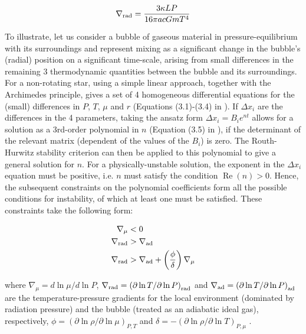 \documentclass[12pt, a4paper]{report}
\begin{document}
\begin{equation}
\nabla_{\textnormal{rad}} = \frac{3\kappa LP}{16\pi acGmT^{4}}
\end{equation}

To illustrate, let us consider a bubble of gaseous material in pressure-equilibrium with its surroundings and represent mixing as a significant change in the bubble's (radial) position on a significant time-scale, arising from small differences in the remaining 3 thermodynamic quantities between the bubble and its surroundings. For a non-rotating star, using a simple linear approach, together with the Archimedes principle, gives a set of 4 homogeneous differential equations for the (small) differences in $P$, $T$, $\mu$ and $r$ (Equations (3.1)-(3.4) in \cite{2017RSOS....470192S}). If $\Delta x_{i}$ are the differences in the 4 parameters, taking the ansatz form $\Delta x_{i} = B_{i} e^{nt}$ allows for a solution as a 3rd-order polynomial in $n$ (Equation (3.5) in \cite{2017RSOS....470192S}), if the determinant of the relevant matrix (dependent of the values of the $B_{i}$) is zero. The Routh-Hurwitz stability criterion can then be applied to this polynomial to give a general solution for $n$. For a physically-unstable solution, the exponent in the $\Delta x_{i}$ equation must be positive, i.e. $n$ must satisfy the condition $\operatorname{Re}(n) > 0$. Hence, the subsequent constraints on the polynomial coefficients form all the possible conditions for instability,  of which at least one must be satisfied. These constraints take the following form:

\begin{align}
\nabla _{\mu} &< 0 \label{mu_inv_ineq} \\
\nabla _{\textnormal{rad}} &> \nabla _{\textnormal{ad}} \label{schwarz_ineq} \\
\nabla _{\textnormal{rad}} &> \nabla _{\textnormal{ad}} + \left( \frac{\phi}{\delta} \right) \nabla _{\mu} \label{ledoux_ineq}
\end{align}

where $\nabla _{\mu} = d\ln\mu / d\ln P$, $\nabla _{\textnormal{rad}} = \left(\partial\ln T / \partial\ln P \right)_{\textnormal{rad}}$ and $\nabla _{\textnormal{ad}} = \left(\partial\ln T / \partial\ln P \right)_{\textnormal{ad}}$ are the temperature-pressure gradients for the local environment (dominated by radiation pressure) and the bubble (treated as an adiabatic ideal gas), respectively, $\phi = \left( \partial \ln\rho / \partial \ln\mu \right)_{P,T}$ and $\delta = -\left( \partial \ln\rho / \partial \ln T \right)_{P,\mu}$  \citep{1980A&A....91..175K}.
\end{document}
